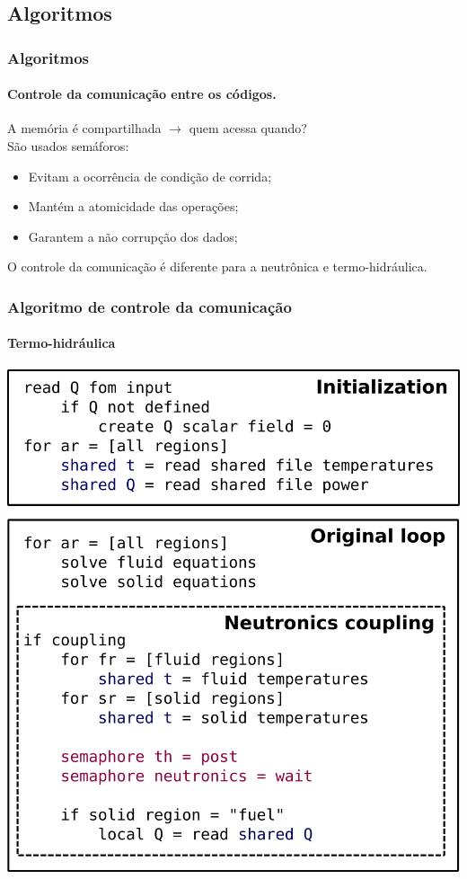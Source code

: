 \documentclass[svgnames,smaller,table]{beamer}
\begin{document}
\subsection{Algoritmos}
\begin{frame}
  \frametitle{Algoritmos}
  \framesubtitle{Controle da comunicação entre os códigos.}
  A memória é compartilhada $\rightarrow$ quem acessa quando?  
  \\
  \vspace{0.5cm}
  São usados semáforos:
  \begin{itemize}
  \item Evitam a ocorrência de condição de corrida;
  \item Mantém a atomicidade das operações;
  \item Garantem a não corrupção dos dados;
  \end{itemize}
  \vspace{0.5cm}
  O controle da comunicação é diferente para a neutrônica e termo-hidráulica.
\end{frame}


\begin{frame}
  \frametitle{Algoritmo de controle da comunicação}
  \framesubtitle{Termo-hidráulica}
  \centering\includegraphics[scale=0.3]{../figuras/algoritmo_openfoam.png}  
\end{frame}
\end{document}
